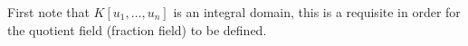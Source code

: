 First note that $K[u_1,\ldots ,u_n]$ is an integral domain, this is a requisite in order for the quotient field (fraction field) to be defined. 


